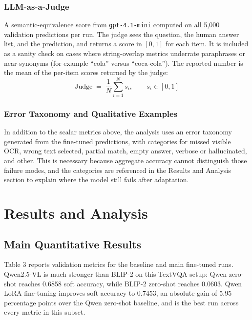 \documentclass[11pt]{article}
\begin{document}
\subsubsection{LLM-as-a-Judge}

A semantic-equivalence score from \texttt{gpt-4.1-mini} computed on all 5{,}000 validation predictions per run. The judge sees the question, the human answer list, and the prediction, and returns a score in $[0, 1]$ for each item. It is included as a sanity check on cases where string-overlap metrics underrate paraphrases or near-synonyms (for example ``cola'' versus ``coca-cola''). The reported number is the mean of the per-item scores returned by the judge:
\[
\mathrm{Judge} \;=\; \frac{1}{N} \sum_{i=1}^{N} s_i,\qquad s_i \in [0, 1]
\]

\subsubsection{Error Taxonomy and Qualitative Examples}

In addition to the scalar metrics above, the analysis uses an error taxonomy generated from the fine-tuned predictions, with categories for missed visible OCR, wrong text selected, partial match, empty answer, verbose or hallucinated, and other. This is necessary because aggregate accuracy cannot distinguish those failure modes, and the categories are referenced in the Results and Analysis section to explain where the model still fails after adaptation.

\section{Results and Analysis}

\subsection{Main Quantitative Results}

Table 3 reports validation metrics for the baseline and main fine-tuned runs. Qwen2.5-VL is much stronger than BLIP-2 on this TextVQA setup: Qwen zero-shot reaches 0.6858 soft accuracy, while BLIP-2 zero-shot reaches 0.0603. Qwen LoRA fine-tuning improves soft accuracy to 0.7453, an absolute gain of 5.95 percentage points over the Qwen zero-shot baseline, and is the best run across every metric in this subset.
\end{document}
